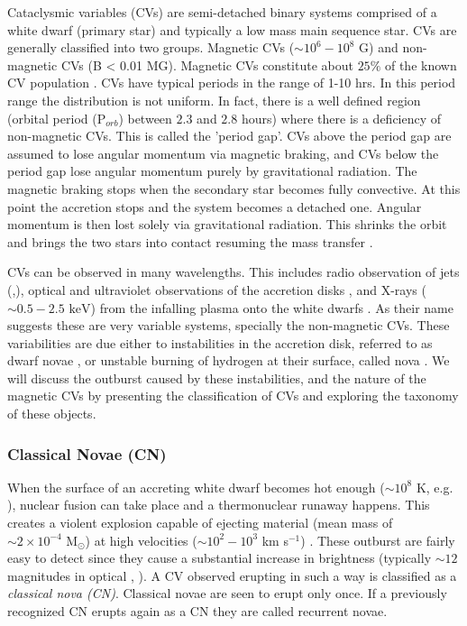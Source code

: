 Cataclysmic variables (CVs) are semi-detached binary systems comprised of a white dwarf (primary star) and typically a low mass main sequence star. CVs are generally classified into two groups. Magnetic CVs ($\sim 10^6 - 10^8$ G) and non-magnetic CVs (B < 0.01 MG). Magnetic CVs constitute about $25 \%$ of the known CV population \citep{balman_x-ray_2012}. CVs have typical periods in the range of 1-10 hrs. In this period range the distribution is not uniform. In fact, there is a well defined region (orbital period (P$_{orb}$) between $2.3$ and $2.8$ hours) where there is a deficiency of non-magnetic CVs. This is called the 'period gap'. CVs above the period gap are assumed to lose  angular momentum via magnetic braking, and CVs below the period gap lose angular momentum purely by gravitational radiation. The magnetic braking  stops when the secondary star becomes fully convective. At this point the accretion stops and the system becomes a detached one. Angular momentum is then lost solely via gravitational radiation. This shrinks the orbit and brings the two stars into contact resuming the mass transfer \citep[e.g.][]{warner_cataclysmic_2003}.

CVs can be observed in many wavelengths. This includes radio observation of jets (\citealt{nova_jets_2008},\citealt{coppejans_novalike_2015}), optical and ultraviolet observations of the accretion disks \citep{1994ASPC...54...61K}, and X-rays ($\sim 0.5-2.5 \text{ keV}$) from the infalling plasma onto the white dwarfs \citep{verbunt_cataclysmic_1997}. As their name suggests these are very variable systems, specially the non-magnetic CVs. These variabilities are due either to instabilities in the accretion disk, referred to as dwarf novae \citep{osaki_accretion_1974}, or unstable burning of hydrogen at their surface, called nova \citep{starrfield_thermonuclear_2016}. We will discuss the outburst caused by these instabilities, and the nature of the magnetic CVs by presenting the classification of CVs and exploring the taxonomy of these objects.  


\subsubsection{Classical Novae (CN)}

When the surface of an accreting white dwarf becomes hot enough ($\sim 10^8$ K, e.g. \cite{starrfield_thermonuclear_2016}), nuclear fusion can take place and a thermonuclear runaway happens. This creates a violent explosion capable of ejecting material (mean mass of $\sim 2 \times 10^{-4} \text{ M}_\odot$) at high velocities ($\sim 10^2 - 10^3$ km s$^{-1}$) \citep{gehrz_nucleosynthesis_1998,shara_recent_1989}. These outburst are fairly easy to detect since they cause a substantial increase in brightness (typically $\sim 12$ magnitudes in optical , \citealt{shara_recent_1989}). A CV observed erupting in such a way is classified as a \emph{classical nova (CN)}. Classical novae are seen to erupt only once. If a previously recognized CN erupts again as a CN they are called recurrent novae. 

